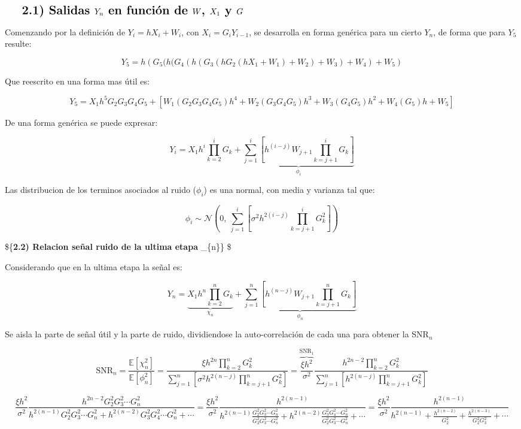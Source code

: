 \documentclass[11pt]{article}
\begin{document}
    \({\quad \quad \Large\textbf{2.1) Salidas } Y_{n}\textbf{ en función de } W \textbf{, } X_1 \textbf{ y } G}\)

Comenzando por la definición de \(Y_{i} = h X_i + W_i\), con
\(X_i = G_i Y_{i-1}\), se desarrolla en forma genérica para un cierto
\(Y_n\), de forma que para \(Y_5\) resulte:

\[ Y_5 = h \left(  G_5(h (G_4(h (G_3(h G_2(h X_1 + W_1) + W_2) + W_3) + W_4) + W_5 \right) \]

Que reescrito en una forma mas útil es:

\[ Y_5 = X_1 h^5 G_2 G_3 G_4 G_5 + \left[  W_1 (G_2 G_3 G_4 G_5) h^4 + W_2 (G_3 G_4 G_5) h^3 + W_3 (G_4 G_5) h^2 + W_4 (G_5) h + W_5 \right]  \]

De una forma genérica se puede expresar:

\[ Y_{i} = X_{1} h^{i} \prod_{k=2}^{i} G_{k} + \underbrace{\sum_{j=1}^{i} \left[ h^{(i-j)} W_{j+1}  \prod_{k=j+1}^{i} G_{k} \right]}_{\phi_{i}} \]

Las distribucion de los terminos asociados al ruido (\(\phi_{i}\)) es
una normal, con media y varianza tal que:

\[  \phi_{i} \sim \mathcal{N}\left( 0,~ \sum_{j=1}^{i} \left[ \sigma^2 h^{2(i-j)} \prod_{k=j+1}^{i} G_{k}^{2} \right] \right) \]

    \$\{\quad \quad \Large\textbf{2.2) Relacion señal ruido de la ultima etapa }
\rho\_\{n\}\} \$

Considerando que en la ultima etapa la señal es:

\[ Y_{n} = \underbrace{X_{1} h^{n} \prod_{k=2}^{n} G_{k}}_{\chi_{n}} + \underbrace{\sum_{j=1}^{n} \left[ h^{(n-j)} W_{j+1}  \prod_{k=j+1}^{n} G_{k} \right]}_{\phi_{n}} \]

Se aisla la parte de señal útil y la parte de ruido, dividiendose la
auto-correlación de cada una para obtener la SNR\(_{n}\)

\[ \text{SNR}_{n} = \frac{\mathbb{E}[\chi_{n}^{2}]}{\mathbb{E}[\phi_{n}^{2}]} = \frac{\xi h^{2n} \prod_{k=2}^{n} G_{k}^{2}}{\sum_{j=1}^{n} \left[ \sigma^2 h^{2(n-j)} \prod_{k=j+1}^{n} G_{k}^{2} \right]} = \overbrace{\frac{\xi h^2}{\sigma^2}}^{\text{SNR}_1} \frac{ h^{2n-2} \prod_{k=2}^{n} G_{k}^{2}}{\sum_{j=1}^{n} \left[ h^{2(n-j)} \prod_{k=j+1}^{n} G_{k}^{2} \right]} \]

\[ \frac{\xi h^2}{\sigma^2} \frac{h^{2n-2} G_{2}^{2} G_{3}^{2} \cdots G_{n}^{2}}{h^{2(n-1)} G_{2}^{2} G_{3}^{2} \cdots G_{n}^{2} + h^{2(n-2)} G_{3}^{2} G_{4}^{2} \cdots G_{n}^{2} + \cdots} = \frac{\xi h^2}{\sigma^2} \frac{h^{2(n-1)}}{h^{2(n-1)} \frac{G_{2}^{2} G_{3}^{2} \cdots G_{n}^{2}}{G_{2}^{2} G_{3}^{2} \cdots G_{n}^{2}} + h^{2(n-2)} \frac{G_{3}^{2} G_{4}^{2} \cdots G_{n}^{2}}{G_{2}^{2} G_{3}^{2} \cdots G_{n}^{2}} + \cdots} = \frac{\xi h^2}{\sigma^2} \frac{h^{2(n-1)}}{h^{2(n-1)} + \frac{h^{2(n-2)}}{G_{2}^{2}} + \frac{h^{2(n-3)}}{G_{2}^{2} G_{3}^{2}} + \cdots}\]
\end{document}
